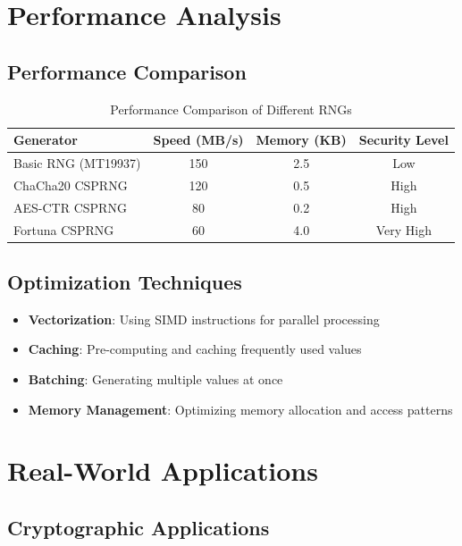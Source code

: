 \documentclass[11pt,a4paper]{article}
\begin{document}
\section{Performance Analysis}

\subsection{Performance Comparison}

\begin{table}[h]
\centering
\begin{tabular}{|l|c|c|c|}
\hline
\textbf{Generator} & \textbf{Speed (MB/s)} & \textbf{Memory (KB)} & \textbf{Security Level} \\
\hline
Basic RNG (MT19937) & 150 & 2.5 & Low \\
ChaCha20 CSPRNG & 120 & 0.5 & High \\
AES-CTR CSPRNG & 80 & 0.2 & High \\
Fortuna CSPRNG & 60 & 4.0 & Very High \\
\hline
\end{tabular}
\caption{Performance Comparison of Different RNGs}
\end{table}

\subsection{Optimization Techniques}

\begin{itemize}
    \item \textbf{Vectorization}: Using SIMD instructions for parallel processing
    \item \textbf{Caching}: Pre-computing and caching frequently used values
    \item \textbf{Batching}: Generating multiple values at once
    \item \textbf{Memory Management}: Optimizing memory allocation and access patterns
\end{itemize}

\section{Real-World Applications}

\subsection{Cryptographic Applications}
\end{document}
